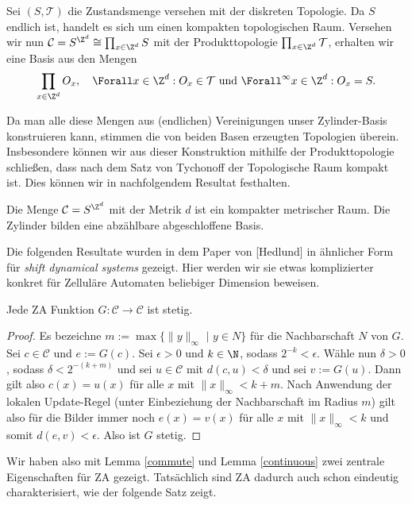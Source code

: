 Sei $(S, \mathcal{T})$ die Zustandsmenge versehen mit der diskreten Topologie. Da $S$ endlich ist, handelt es sich um einen kompakten topologischen Raum. Versehen wir nun $\mathcal{C} = S^{\Z^d} \cong \prod_{x \in \Z^d}S$ mit der Produkttopologie $\prod_{x \in \Z^d}\mathcal{T}$, erhalten wir eine Basis aus den Mengen
\begin{align*}
  \prod_{x \in \Z^d}O_x, \quad \Forall x \in \Z^d: O_x \in \mathcal{T} \text{~und~} \Forall^{\infty} x \in \Z^d: O_x = S.
\end{align*}

Da man alle diese Mengen aus (endlichen) Vereinigungen unser Zylinder-Basis konstruieren kann, stimmen die von beiden Basen erzeugten Topologien überein. Insbesondere können wir aus dieser Konstruktion mithilfe der Produkttopologie schließen, dass nach dem Satz von Tychonoff der Topologische Raum kompakt ist. Dies können wir in nachfolgendem Resultat festhalten.

\begin{proposition}
  Die Menge $\mathcal{C} = S^{\Z^d}$ mit der Metrik $d$ ist ein kompakter metrischer Raum. Die Zylinder bilden eine abzählbare abgeschloffene Basis.
\end{proposition}

Die folgenden Resultate wurden in dem Paper von [Hedlund] in ähnlicher Form für \textit{shift dynamical systems} gezeigt. Hier werden wir sie etwas komplizierter konkret für Zelluläre Automaten  beliebiger Dimension beweisen.

\begin{lemma}\label{continuous}
  Jede ZA Funktion $G: \mathcal{C} \to \mathcal{C}$ ist stetig.
\end{lemma}

\begin{proof}
  Es bezeichne $m := \max \{\|y\|_\infty \text{~}| \text{~} y \in N\}$ für die Nachbarschaft $N$ von $G$. Sei $c \in \mathcal{C}$ und $e := G(c)$. Sei $\epsilon > 0$ und $k \in \N$, sodass $2^{-k} < \epsilon$. Wähle nun $\delta > 0$, sodass $\delta < 2^{-(k+m)}$ und sei $u \in \mathcal{C}$ mit $d(c,u) < \delta$ und sei $v := G(u)$. Dann gilt also $c(x) = u(x)$ für alle $x$ mit $\|x\|_\infty < k+m$. Nach Anwendung der lokalen Update-Regel (unter Einbeziehung der Nachbarschaft im Radius $m$) gilt also für die Bilder immer noch $e(x) = v(x)$ für alle $x$ mit $\|x\|_\infty < k$ und somit $d(e,v) < \epsilon$. Also ist $G$ stetig.
\end{proof}

Wir haben also mit Lemma \ref{commute} und Lemma \ref{continuous} zwei zentrale Eigenschaften für ZA gezeigt. Tatsächlich sind ZA dadurch auch schon eindeutig charakterisiert, wie der folgende Satz zeigt.

